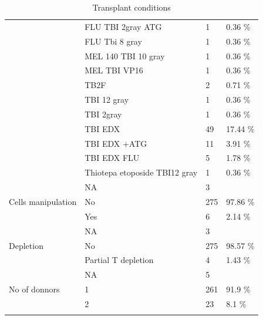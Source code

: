 \documentclass[a4paper,11pt] {article}
\begin{document}
\begin{longtable}{llll}
   & FLU TBI 2gray ATG & 1 & 0.36 \% \\ 
   & FLU Tbi 8 gray & 1 & 0.36 \% \\ 
   & MEL 140 TBI 10 gray & 1 & 0.36 \% \\ 
   & MEL TBI VP16 & 1 & 0.36 \% \\ 
   & TB2F & 2 & 0.71 \% \\ 
   & TBI 12 gray & 1 & 0.36 \% \\ 
   & TBI 2gray & 1 & 0.36 \% \\ 
   & TBI EDX & 49 & 17.44 \% \\ 
   & TBI EDX +ATG & 11 & 3.91 \% \\ 
   & TBI EDX FLU & 5 & 1.78 \% \\ 
   & Thiotepa etoposide TBI12 gray & 1 & 0.36 \% \\ 
   & NA & 3 &  \\ 
  Cells manipulation & No & 275 & 97.86 \% \\ 
   & Yes & 6 & 2.14 \% \\ 
   & NA & 3 &  \\ 
  Depletion & No & 275 & 98.57 \% \\ 
   & Partial T depletion & 4 & 1.43 \% \\ 
   & NA & 5 &  \\ 
  No of donnors & 1 & 261 & 91.9 \% \\ 
   & 2 & 23 & 8.1 \% \\ 
   \hline
\hline
\caption{Transplant conditions} 
\label{tab:g}
\end{longtable}
\pagebreak
\end{document}
